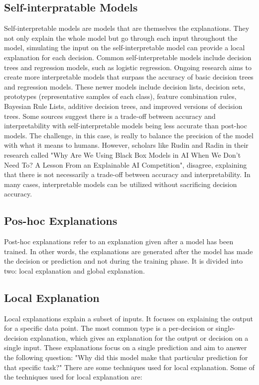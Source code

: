 \documentclass[10pt,journal,compsoc]{IEEEtran}
\begin{document}
\subsection{Self-interpratable Models}
Self-interpretable models are models that are themselves the explanations. They not only explain the whole model but go through each input throughout the model, simulating the input on the self-interpretable model can provide a local explanation for each decision.
Common self-interpretable models include decision trees and regression models, such as logistic regression. Ongoing research aims to create more interpretable models that surpass the accuracy of basic decision trees and regression models. These newer models include decision lists, decision sets, prototypes (representative samples of each class), feature combination rules, Bayesian Rule Lists, additive decision trees, and improved versions of decision trees.
Some sources suggest there is a trade-off between accuracy and interpretability with self-interpretable models being less accurate than post-hoc models. The challenge, in this case, is really to balance the precision of the model with what it means to humans. However, scholars like Rudin\cite{rudin} and Radin\cite{radin} in their research called "Why Are We Using Black Box Models in AI When We Don’t Need To? A Lesson From an Explainable AI Competition", disagree, explaining that there is not necessarily a trade-off between accuracy and interpretability. In many cases, interpretable models can be utilized without sacrificing decision accuracy.\cite{phillips2020four}

\subsection{Pos-hoc Explanations}
Post-hoc explanations refer to an explanation given after a model has been trained. In other words, the explanations are generated after the model has made the decision or prediction and not during the training phase. It is divided into two: local explanation and global explanation.

\subsection{Local Explanation} Local explanations explain a subset of inputs. It focuses on explaining the output for a specific data point. The most common type is a per-decision or single-decision explanation, which gives an explanation for the output or decision on a single input.\cite{phillips2020four}
These explanations focus on a single prediction and aim to answer the following question: "Why did this model make that particular prediction for that specific task?" There are some techniques used for local explanation. Some of the techniques used for local explanation are:
\end{document}
